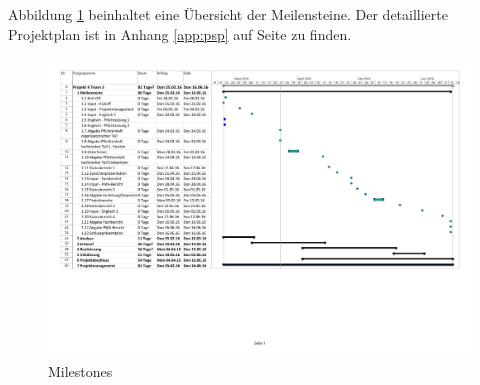 Abbildung    \ref{fig:milestones}    beinhaltet     eine    \"Ubersicht    der
Meilensteine. Der  detaillierte Projektplan  ist in  Anhang \ref{app:psp}  auf
Seite \pageref{app:psp} zu finden.


%
%
%


\begin{figure}[h!]
    \centering
    \includegraphics[width=1.55\textwidth,clip=true,trim = 10mm 80mm 0mm 0mm]{images/milestones.pdf}
    \caption{Milestones}
    \label{fig:milestones}
\end{figure}
